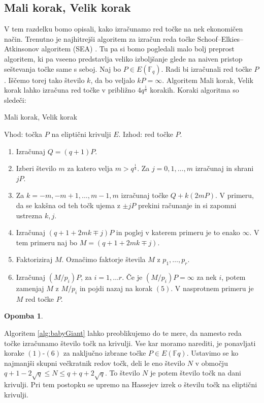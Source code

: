 \documentclass[12pt,a4paper,twoside]{article}
\theoremstyle{definition} %
\newtheorem{opomba}[definicija]{Opomba}
\theoremstyle{plain} %
\numberwithin{equation}{section}  %
\newcommand{\F}{\mathbb F}
\begin{document}
\subsection{Mali korak, Velik korak}
V tem razdelku bomo opisali, kako izračunamo red točke na nek ekonomičen način. Trenutno je najhitrejši algoritem za izračun reda točke Schoof–Elkies–Atkinsonov algoritem (SEA) \cite{Schoof1995}. Tu pa si bomo pogledali malo bolj preprost algoritem, ki pa vseeno predstavlja veliko izboljšanje glede na naiven pristop seštevanja točke same s seboj.
Naj bo $P \in E(\F_q)$. Radi bi izračunali red točke $P$. Iščemo torej tako število $k$, da bo veljalo $kP = \infty$. Algoritem Mali korak, Velik korak lahko izračuna red točke v približno $4q^{\frac{1}{4}}$ korakih. Koraki algoritma so sledeči:

\begin{algorithm}[H]
\caption[MV]{Mali korak, Velik korak}
\label{alg:babyGiant}
Vhod: točka $P$ na eliptični krivulji $E$.\newline
Izhod: red točke $P$. \newline
\begin{enumerate}
\item Izračunaj $Q = (q+1)P$.
\item Izberi število $m$ za katero velja $m >q^{\frac{1}{4}}$. Za $j = 0,1,\ldots,m$ izračunaj in shrani $jP$.
\item Za $k = -m,-m+1,\ldots,m-1,m$ izračunaj točke $Q +k(2mP)$. V primeru, da se kakšna od teh točk ujema z $\pm jP$ prekini računanje in si zapomni ustrezna $k,j$.
\item Izračunaj $(q+1+2mk \mp j)P$ in poglej v katerem primeru je to enako $\infty$. V tem primeru naj bo $M = (q+1+2mk \mp j)$.
\item Faktoriziraj $M$. Označimo faktorje števila $M$ z $p_1,\ldots,p_r$.
\item Izračunaj $(M/p_i)P$, za $i=1,\ldots r$. Če je $(M/p_i)P = \infty$ za nek $i$, potem zamenjaj $M$ z $M/p_i$ in pojdi nazaj na korak $(5)$. V nasprotnem primeru je $M$ red točke $P$.
\end{enumerate}

\end{algorithm}

\begin{opomba}~

\label{opo:MaliVeliki}
Algoritem \ref{alg:babyGiant} lahko preoblikujemo do te mere, da namesto reda točke izračunamo število točk na krivulji. Vse kar moramo narediti, je ponavljati korake $(1)$-$(6)$ za naključno izbrane točke $P \in E(\F{q})$. Ustavimo se ko najmanjši skupni večkratnik redov točk, deli le eno število $N$ v območju $q+1-2\sqrt{q} \leq N \leq q+q+2\sqrt{q}$. To število $N$ je potem število točk na dani krivulji. Pri tem postopku se upremo na Hassejev izrek o številu točk na eliptični krivulji.

\end{opomba}
\end{document}
